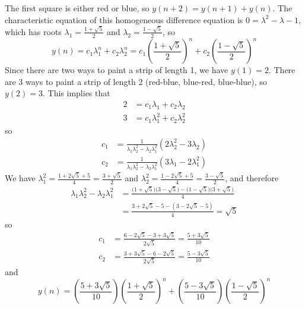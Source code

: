 \documentclass[newpage]{homework}
\begin{document}
	The first square is either red or blue, so $y(n+2) = y(n+1) + y(n)$. The characteristic equation of this homogeneous difference equation is $0=\lambda^2 - \lambda - 1$, which has roots $\lambda_1 = \frac{1 + \sqrt{5}}{2}$ and $\lambda_2 = \frac{1-\sqrt{5}}{2}$, so
	\begin{equation*}
	y(n) = c_1\lambda_1^n + c_2\lambda_2^n = c_1\left(\frac{1+\sqrt{5}}{2}\right)^n+c_2\left(\frac{1-\sqrt{5}}{2}\right)^n
	\end{equation*}
	Since there are two ways to paint a strip of length 1, we have $y(1) = 2$. There are 3 ways to paint a strip of length 2 (red-blue, blue-red, blue-blue), so $y(2) = 3$. This implies that
	\begin{equation*}
		\begin{aligned}
			2 &= c_1\lambda_1 + c_2\lambda_2 \\
			3 &= c_1\lambda_1^2 + c_2\lambda_2^2
		\end{aligned}
	\end{equation*}
	so
	\begin{equation*}
		\begin{aligned}
			c_1 &= \frac{1}{\lambda_1\lambda_2^2 - \lambda_2\lambda_1^2}(2\lambda_2^2 - 3\lambda_2) \\
			c_2 &= \frac{1}{\lambda_1\lambda_2^2-\lambda_2\lambda_1^2}(3\lambda_1 - 2\lambda_1^2)
		\end{aligned}
	\end{equation*}
	We have $\lambda_1^2 = \frac{1+2\sqrt{5}+5}{4} = \frac{3+\sqrt{5}}{2}$ and $\lambda_2^2 = \frac{1-2\sqrt{5}+5}{4} = \frac{3-\sqrt{5}}{2}$, and therefore
	\begin{equation*}
		\begin{aligned}
			\lambda_1\lambda_2^2 - \lambda_2\lambda_1^2 &= \frac{\big(1+\sqrt{5}\big)\big(3-\sqrt{5}\big) - 		\big(1-\sqrt{5}\big)\big(3+\sqrt{5}\big)}{4} \\
			&=\frac{3+2\sqrt{5}-5-(3-2\sqrt{5}-5)}{4}=\sqrt{5}
		\end{aligned}
	\end{equation*}
	so
	\begin{equation*}
		\begin{aligned}
			c_1 &= \frac{6-2\sqrt{5}-3+3\sqrt{5}}{2\sqrt{5}} = \frac{5+3\sqrt{5}}{10}\\
			c_2 &= \frac{3+3\sqrt{5}-6 -2\sqrt{5}}{2\sqrt{5}} = \frac{5-3\sqrt{5}}{10}
		\end{aligned}
	\end{equation*}
	and
	\begin{equation*}
		y(n) = \left(\frac{5+3\sqrt{5}}{10}\right)\left(\frac{1+\sqrt{5}}{2}\right)^n + \left(\frac{5-3\sqrt{5}}{10}\right)\left(\frac{1-\sqrt{5}}{2}\right)^n
	\end{equation*}
	
\end{document}
